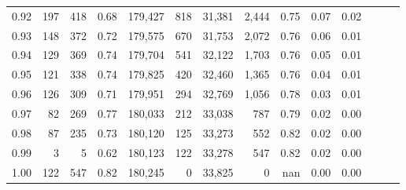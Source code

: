 \begin{tabular}{rrrrrrrrrrrrrr}
0.92 &    197 &  418 &  0.68 &  179,427 &      818 &  31,381 &   2,444 &  0.75 &  0.07 &      0.02 \\
0.93 &    148 &  372 &  0.72 &  179,575 &      670 &  31,753 &   2,072 &  0.76 &  0.06 &      0.01 \\
0.94 &    129 &  369 &  0.74 &  179,704 &      541 &  32,122 &   1,703 &  0.76 &  0.05 &      0.01 \\
0.95 &    121 &  338 &  0.74 &  179,825 &      420 &  32,460 &   1,365 &  0.76 &  0.04 &      0.01 \\
0.96 &    126 &  309 &  0.71 &  179,951 &      294 &  32,769 &   1,056 &  0.78 &  0.03 &      0.01 \\
0.97 &     82 &  269 &  0.77 &  180,033 &      212 &  33,038 &     787 &  0.79 &  0.02 &      0.00 \\
0.98 &     87 &  235 &  0.73 &  180,120 &      125 &  33,273 &     552 &  0.82 &  0.02 &      0.00 \\
0.99 &      3 &    5 &  0.62 &  180,123 &      122 &  33,278 &     547 &  0.82 &  0.02 &      0.00 \\
1.00 &    122 &  547 &  0.82 &  180,245 &        0 &  33,825 &       0 &   nan &  0.00 &      0.00 \\
\bottomrule
\end{tabular}

